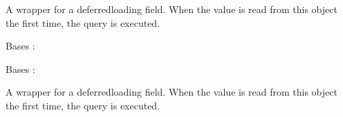 \documentclass[letterpaper,10pt,french]{sphinxmanual}
\begin{document}
\begin{fulllineitems}
\begin{fulllineitems}
\label{\detokenize{index:bookings.models.SupplementPrice.visitor_price_with_swimming_pool}}
\pysigstartsignatures
\pysigline
{}
\pysigstopsignatures
\sphinxAtStartPar
A wrapper for a deferred\sphinxhyphen{}loading field. When the value is read from this
object the first time, the query is executed.

\end{fulllineitems}


\begin{fulllineitems}
\label{\detokenize{index:bookings.models.SupplementPrice.DoesNotExist}}
\pysigstartsignatures
\pysigline
{}
\pysigstopsignatures
\sphinxAtStartPar
Bases : 

\end{fulllineitems}


\begin{fulllineitems}
\label{\detokenize{index:bookings.models.SupplementPrice.MultipleObjectsReturned}}
\pysigstartsignatures
\pysigline
{}
\pysigstopsignatures
\sphinxAtStartPar
Bases : 

\end{fulllineitems}


\begin{fulllineitems}
\label{\detokenize{index:bookings.models.SupplementPrice.id}}
\pysigstartsignatures
\pysigline
{}
\pysigstopsignatures
\sphinxAtStartPar
A wrapper for a deferred\sphinxhyphen{}loading field. When the value is read from this
object the first time, the query is executed.

\end{fulllineitems}


\end{fulllineitems}
\end{document}
